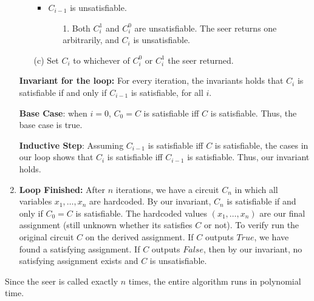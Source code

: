 \documentclass[12pt]{article}
\begin{document}
\begin{solution}
\begin{enumerate}
\begin{enumerate}
\begin{itemize}
                \item $C_{i-1}$ is unsatisfiable. 
                \begin{enumerate}
                    \item[1.]             Both $C_i^1$ and 
                $C_i^0$ are unsatisfiable. The seer returns one arbitrarily, 
                and $C_i$ is unsatisfiable.
                \end{enumerate}

            \end{itemize}

            \item[(c)] Set $C_i$ to whichever of $C_i^0$ or $C_i^1$ the seer 
            returned.
        \end{enumerate}

        \textbf{Invariant for the loop:} For every iteration, the invariants holds that $C_i$ is 
        satisfiable if and only if $C_{i-1}$ is satisfiable, for all 
        $i$.

        \textbf{Base Case}: when $i = 0$, $C_0 = C$ is satisfiable iff 
            $C$ is satisfiable. Thus, the base case is true.

        \textbf{Inductive Step}: Assuming $C_{i-1}$ is satisfiable iff 
            $C$ is satisfiable, the cases in our loop shows that $C_i$ 
            is satisfiable iff $C_{i-1}$ is satisfiable. Thus, our invariant holds.

        \item \textbf{Loop Finished:} After $n$ iterations, we have a circuit $C_n$ in which all 
        variables $x_1, \ldots, x_n$ are hardcoded. By our invariant, $C_n$ 
        is satisfiable if and only if $C_0 = C$ is satisfiable. The hardcoded 
        values $(x_1, \ldots, x_n)$ are our final assignment (still unknown whether its satisfies $C$ or not). To verify run the original circuit $C$ on the derived assignment. If $C$ outputs $\mathit{True}$, we have found a 
        satisfying assignment. If $C$ outputs $\mathit{False}$, then by our 
        invariant, no satisfying assignment exists and $C$ is unsatisfiable.
    \end{enumerate}

    Since the seer is called exactly $n$ times, the entire algorithm runs in polynomial time.
        
\end{solution}
\end{document}
